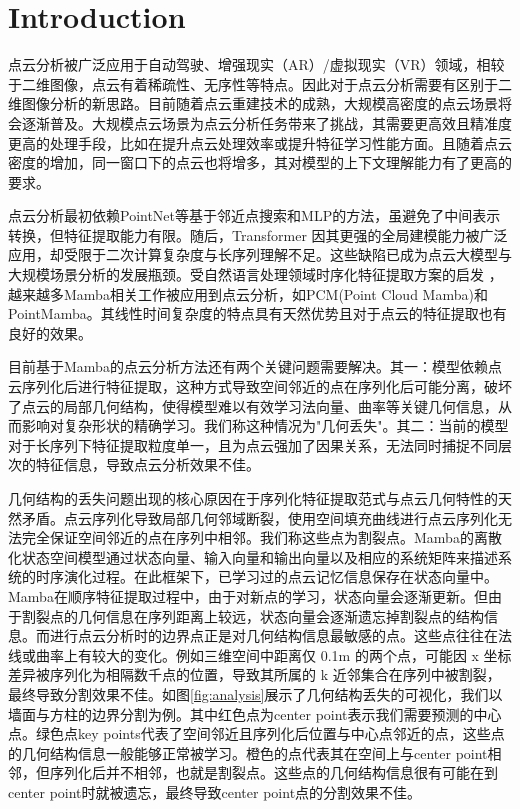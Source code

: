 \documentclass[preprint,12pt]{elsarticle}
\begin{document}
\section{Introduction}
\label{sec1}

点云分析被广泛应用于自动驾驶、增强现实（AR）/虚拟现实（VR）领域，相较于二维图像，点云有着稀疏性、无序性等特点。因此对于点云分析需要有区别于二维图像分析的新思路。目前随着点云重建技术的成熟，大规模高密度的点云场景将会逐渐普及。大规模点云场景为点云分析任务带来了挑战\cite{Vertex}，其需要更高效且精准度更高的处理手段，比如在提升点云处理效率或提升特征学习性能方面。且随着点云密度的增加，同一窗口下的点云也将增多，其对模型的上下文理解能力有了更高的要求。

点云分析最初依赖PointNet\cite{pointnet,PointNet++}等基于邻近点搜索和MLP的方法，虽避免了中间表示转换，但特征提取能力有限。随后，Transformer\cite{pt,ptv3,superpoint} 因其更强的全局建模能力被广泛应用，却受限于二次计算复杂度与长序列理解不足。这些缺陷已成为点云大模型与大规模场景分析的发展瓶颈。受自然语言处理领域时序化特征提取方案的启发 \cite{ssm,Mamba,Lstm}，越来越多Mamba\cite{Mamba,VisionMamba}相关工作被应用到点云分析，如PCM(Point Cloud Mamba)\cite{pcm}和PointMamba\cite{PointMamba}。其线性时间复杂度的特点具有天然优势且对于点云的特征提取也有良好的效果。

目前基于Mamba的点云分析方法还有两个关键问题需要解决。其一：模型依赖点云序列化后进行特征提取，这种方式导致空间邻近的点在序列化后可能分离，破坏了点云的局部几何结构，使得模型难以有效学习法向量、曲率等关键几何信息，从而影响对复杂形状的精确学习。我们称这种情况为"几何丢失"。其二：当前的模型对于长序列下特征提取粒度单一，且为点云强加了因果关系，无法同时捕捉不同层次的特征信息，导致点云分析效果不佳。

几何结构的丢失问题出现的核心原因在于序列化特征提取范式与点云几何特性的天然矛盾。点云序列化导致局部几何邻域断裂，使用空间填充曲线进行点云序列化无法完全保证空间邻近的点在序列中相邻。我们称这些点为割裂点。Mamba的离散化状态空间模型通过状态向量、输入向量和输出向量以及相应的系统矩阵来描述系统的时序演化过程。在此框架下，已学习过的点云记忆信息保存在状态向量中。Mamba在顺序特征提取过程中，由于对新点的学习，状态向量会逐渐更新。但由于割裂点的几何信息在序列距离上较远，状态向量会逐渐遗忘掉割裂点的结构信息。而进行点云分析时的边界点正是对几何结构信息最敏感的点。这些点往往在法线或曲率上有较大的变化。例如三维空间中距离仅 0.1m 的两个点，可能因 x 坐标差异被序列化为相隔数千点的位置，导致其所属的 k 近邻集合在序列中被割裂，最终导致分割效果不佳。如图\ref{fig:analysis}展示了几何结构丢失的可视化，我们以墙面与方柱的边界分割为例。其中红色点为center point表示我们需要预测的中心点。绿色点key points代表了空间邻近且序列化后位置与中心点邻近的点，这些点的几何结构信息一般能够正常被学习。橙色的点代表其在空间上与center point相邻，但序列化后并不相邻，也就是割裂点。这些点的几何结构信息很有可能在到center point时就被遗忘，最终导致center point点的分割效果不佳。
\end{document}
